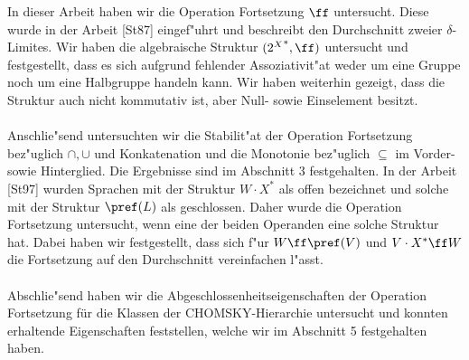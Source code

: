In dieser Arbeit haben wir die Operation Fortsetzung $\ff$ untersucht. Diese wurde in der Arbeit [St87] eingef"uhrt und beschreibt den Durchschnitt zweier $\delta$-Limites.
Wir haben die algebraische Struktur $({2^X}^*,\ff)$ untersucht und festgestellt, dass es sich aufgrund fehlender Assoziativit"at weder um eine Gruppe noch um eine Halbgruppe handeln kann. Wir haben weiterhin gezeigt, dass die Struktur auch nicht kommutativ ist, aber Null- sowie Einselement besitzt. 
\\\\Anschlie"send untersuchten wir die Stabilit"at der Operation Fortsetzung bez"uglich $\cap,\cup$ und Konkatenation und die 
Monotonie bez"uglich $\subseteq$ im Vorder- sowie Hinterglied. Die Ergebnisse sind im Abschnitt 3 festgehalten.
In der Arbeit [St97] wurden Sprachen mit der Struktur $W\cdot X^*$ als offen bezeichnet und solche mit der Struktur $\pref(L)$ als geschlossen. Daher wurde die Operation Fortsetzung untersucht, wenn eine der beiden Operanden eine solche Struktur hat.
Dabei haben wir festgestellt, dass sich f"ur $W\ff\pref(V)$ und $V\cdot X^*\ff W$ die Fortsetzung auf den Durchschnitt vereinfachen l"asst.
\\\\Abschlie"send haben wir die Abgeschlossenheitseigenschaften der Operation Fortsetzung für die Klassen der CHOMSKY-Hierarchie untersucht und konnten erhaltende Eigenschaften feststellen, welche wir im Abschnitt 5 festgehalten haben.

